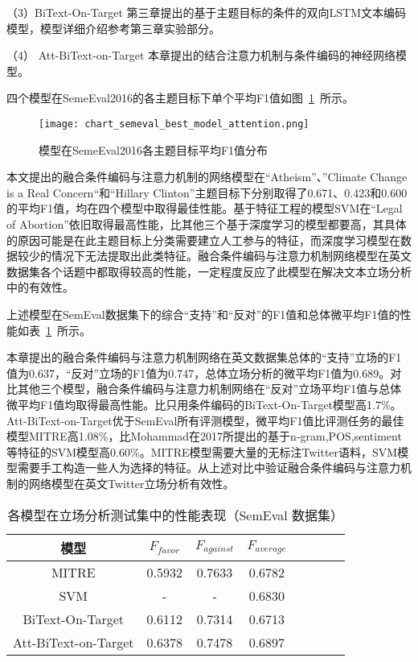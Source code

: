 （3）BiText-On-Target 第三章提出的基于主题目标的条件的双向LSTM文本编码模型，模型详细介绍参考第三章实验部分。

（4） Att-BiText-on-Target 本章提出的结合注意力机制与条件编码的神经网络模型。

四个模型在SemeEval2016的各主题目标下单个平均F1值如图~\ref{chart_semeval_best_model_attention}~所示。
\begin{figure}[htbp]
	\centering
	\texttt{[image: chart\_semeval\_best\_model\_attention.png]}
	\caption[rnn_vanish]{模型在SemeEval2016各主题目标平均F1值分布}
	\label{chart_semeval_best_model_attention}
\end{figure}

本文提出的融合条件编码与注意力机制的网络模型在“Atheism”、”Climate Change is a Real Concern“和“Hillary Clinton”主题目标下分别取得了0.671、0.423和0.600的平均F1值，均在四个模型中取得最佳性能。基于特征工程的模型SVM在“Legal of Abortion”依旧取得最高性能，比其他三个基于深度学习的模型都要高，其具体的原因可能是在此主题目标上分类需要建立人工参与的特征，而深度学习模型在数据较少的情况下无法提取出此类特征。融合条件编码与注意力机制网络模型在英文数据集各个话题中都取得较高的性能，一定程度反应了此模型在解决文本立场分析中的有效性。

上述模型在SemEval数据集下的综合“支持”和“反对”的F1值和总体微平均F1值的性能如表~\ref{semeval_attention_res}~所示。


本章提出的融合条件编码与注意力机制网络在英文数据集总体的“支持”立场的F1值为0.637，“反对”立场的F1值为0.747，总体立场分析的微平均F1值为0.689。对比其他三个模型，融合条件编码与注意力机制网络在“反对”立场平均F1值与总体微平均F1值均取得最高性能。比只用条件编码的BiText-On-Target模型高1.7\%。Att-BiText-on-Target优于SemEval所有评测模型，微平均F1值比评测任务的最佳模型MITRE高1.08\%，比Mohammad在2017所提出的基于n-gram,POS,sentiment等特征的SVM模型高0.60\%。MITRE模型需要大量的无标注Twitter语料，SVM模型需要手工构造一些人为选择的特征。从上述对比中验证融合条件编码与注意力机制的网络模型在英文Twitter立场分析有效性。

\begin{table}[htbp]
	\caption[table123]{各模型在立场分析测试集中的性能表现（SemEval 数据集）}
	\vspace{0.5em}\centering\wuhao
	\label{semeval_attention_res}
	\begin{tabular}{cccccccc}
		\toprule[1.5pt]
		模型& $F_{favor}$&$F_{against}$&$F_{average}$ \\
		\midrule[1pt]
		MITRE\citeup{zarrella2016mitre}&0.5932&0.7633&0.6782\\
		SVM\citeup{mohammadstance} &-&-&0.6830\\
		BiText-On-Target&0.6112&0.7314&0.6713\\
			Att-BiText-on-Target&0.6378&0.7478&0.6897\\
		\bottomrule[1.5pt]
	\end{tabular}
\end{table}

